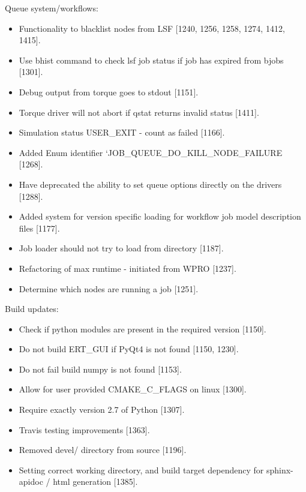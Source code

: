 \documentclass[a4paper,10pt,english]{sphinxmanual}
\begin{document}
Queue system/workflows:
\begin{itemize}
\item {} 
Functionality to blacklist nodes from LSF {[}1240, 1256, 1258, 1274, 1412, 1415{]}.

\item {} 
Use bhist command to check lsf job status if job has expired from bjobs {[}1301{]}.

\item {} 
Debug output from torque goes to stdout {[}1151{]}.

\item {} 
Torque driver will not abort if qstat returns invalid status {[}1411{]}.

\item {} 
Simulation status USER\_EXIT - count as failed {[}1166{]}.

\item {} 
Added Enum identifier ‘JOB\_QUEUE\_DO\_KILL\_NODE\_FAILURE {[}1268{]}.

\item {} 
Have deprecated the ability to set queue options directly on the drivers {[}1288{]}.

\item {} 
Added system for version specific loading for workflow job model
description files {[}1177{]}.

\item {} 
Job loader should not try to load from directory {[}1187{]}.

\item {} 
Refactoring of max runtime - initiated from WPRO {[}1237{]}.

\item {} 
Determine which nodes are running a job {[}1251{]}.

\end{itemize}

Build updates:
\begin{itemize}
\item {} 
Check if python modules are present in the required version {[}1150{]}.

\item {} 
Do not build ERT\_GUI if PyQt4 is not found {[}1150, 1230{]}.

\item {} 
Do not fail build numpy is not found {[}1153{]}.

\item {} 
Allow for user provided CMAKE\_C\_FLAGS on linux {[}1300{]}.

\item {} 
Require exactly version 2.7 of Python {[}1307{]}.

\item {} 
Travis testing improvements {[}1363{]}.

\item {} 
Removed devel/ directory from source {[}1196{]}.

\item {} 
Setting correct working directory, and build target dependency
for sphinx-apidoc / html generation {[}1385{]}.

\end{itemize}
\end{document}
